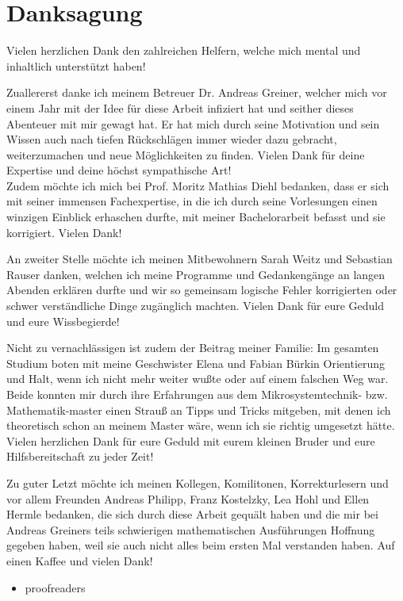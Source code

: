 \chapter{Danksagung}
Vielen herzlichen Dank den zahlreichen Helfern, welche mich mental und inhaltlich unterstützt haben!

Zuallererst danke ich meinem Betreuer Dr. Andreas Greiner, welcher mich vor einem Jahr mit der Idee für diese Arbeit infiziert hat und seither dieses Abenteuer mit mir gewagt hat. Er hat mich durch seine Motivation und sein Wissen auch nach tiefen Rückschlägen immer wieder dazu gebracht, weiterzumachen und neue Möglichkeiten zu finden. Vielen Dank für deine Expertise und deine höchst sympathische Art!\\
Zudem möchte ich mich bei Prof. Moritz Mathias Diehl bedanken, dass er sich mit seiner immensen Fachexpertise, in die ich durch seine Vorlesungen einen winzigen Einblick erhaschen durfte, mit meiner Bachelorarbeit befasst und sie korrigiert. Vielen Dank!

An zweiter Stelle möchte ich meinen Mitbewohnern Sarah Weitz und Sebastian Rauser danken, welchen ich meine Programme und Gedankengänge an langen Abenden erklären durfte und wir so gemeinsam logische Fehler korrigierten oder schwer verständliche Dinge zugänglich machten. Vielen Dank für eure Geduld und eure Wissbegierde!

Nicht zu vernachlässigen ist zudem der Beitrag meiner Familie: Im gesamten Studium boten mit meine Geschwister Elena und Fabian Bürkin Orientierung und Halt, wenn ich nicht mehr weiter wußte oder auf einem falschen Weg war. Beide konnten mir durch ihre Erfahrungen aus dem Mikrosystemtechnik- bzw. Mathematik-master einen Strauß an Tipps und Tricks mitgeben, mit denen ich theoretisch schon an meinem Master wäre, wenn ich sie richtig umgesetzt hätte. Vielen herzlichen Dank für eure Geduld mit eurem kleinen Bruder und eure Hilfsbereitschaft zu jeder Zeit!

Zu guter Letzt möchte ich meinen Kollegen, Komilitonen, Korrekturlesern und vor allem Freunden Andreas Philipp, Franz Kostelzky, Lea Hohl und Ellen Hermle bedanken, die sich durch diese Arbeit gequält haben und die mir bei Andreas Greiners teils schwierigen mathematischen Ausführungen Hoffnung gegeben haben, weil sie auch nicht alles beim ersten Mal verstanden haben. Auf einen Kaffee und vielen Dank!
\begin{itemize}
\item{proofreaders}
\end{itemize}